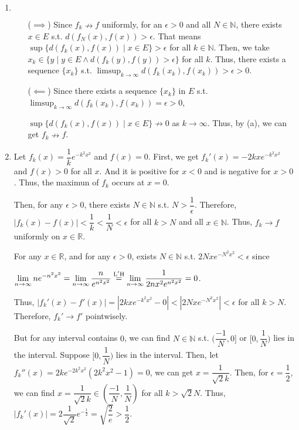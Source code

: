 \documentclass[12pt]{article}
\begin{document}
\begin{enumerate}
\begin{enumerate}
        \item $\ $\begin{enumerate}
            \item[($\implies$)] Since $f_k \nrightarrow f$ uniformly, for an $\epsilon > 0$ and all $N \in \mathbb{N}$, there exists $x \in E$ s.t. $d(f_N(x), f(x)) > \epsilon$.
            That means $\sup \{ d(f_k(x), f(x)) \mid x\in E\} > \epsilon$ for all $k \in \mathbb{N}$.
            Then, we take $x_k\in \{ y \mid y\in E \wedge d(f_k(y), f(y)) > \epsilon\}$ for all $k$.
            Thus, there exists a sequence $\{ x_k\}$ s.t. $\displaystyle\limsup_{k\to\infty} d(f_k(x_k), f(x_k)) > \epsilon > 0$.

            \item[($\impliedby$)] Since there exists a sequence $\{ x_k \}$ in $E$ s.t. $\displaystyle\limsup_{k\to\infty} d(f_k(x_k), f(x_k)) = \epsilon > 0$,

            $\sup \{ d(f_k(x), f(x)) \mid x\in E\} \nrightarrow 0$ as $k \to \infty$.
            Thus, by (a), we can get $f_k \nrightarrow f$.
        \end{enumerate}

        \item Let $f_k(x) = \dfrac{1}{k}e^{-k^2x^2}$ and $f(x) = 0$.
        First, we get $f_k'(x) = -2kxe^{-k^2x^2}$ and $f(x) > 0$ for all $x$.
        And it is positive for $x < 0$ and is negative for $x > 0$.
        Thus, the maximun of $f_k$ occurs at $x = 0$.
        
        Then, for any $\epsilon > 0$, there exists $N \in \mathbb{N}$ s.t. $N > \dfrac{1}{\epsilon}$.
        Therefore, $|f_k(x) - f(x)| < \dfrac{1}{k} < \dfrac{1}{N} < \epsilon$ for all $k > N$ and all $x\in \mathbb{N}$.
        Thus, $f_k \to f$ uniformly on $x \in \mathbb{R}$.

        For any $x \in \mathbb{R}$, and for any $\epsilon > 0$, exists $N \in \mathbb{N}$
        s.t. $2Nxe^{-N^2x^2} < \epsilon$ since 
        
        $\displaystyle\lim_{n\to\infty} ne^{-n^2x^2} = \displaystyle\lim_{n\to\infty} \dfrac{n}{e^{n^2x^2}} \overset{\rm L'H}{=} \displaystyle\lim_{n\to\infty} \dfrac{1}{2nx^2e^{n^2x^2}} = 0$.

        Thus, $|f_k'(x) - f'(x)| = |2kxe^{-k^2x^2} - 0| < |2Nxe^{-N^2x^2}| < \epsilon$ for all $k > N$.
        Therefore, $f_k' \to f'$ pointwisely.

        But for any interval contains $0$, we can find $N \in \mathbb{N}$ s.t. $(\dfrac{-1}{N}, 0]$ or $[0, \dfrac{1}{N})$ lies in the interval.
        Suppose $[0, \dfrac{1}{N})$ lies in the interval.
        Then, let $f_k''(x) = 2ke^{-2k^2x^2}(2k^2x^2 - 1) = 0$, we can get $x = \dfrac{1}{\sqrt{2} k}$.
        Then, for $\epsilon = \dfrac{1}{2}$, we can find $x = \dfrac{1}{\sqrt{2}k} \in (\dfrac{-1}{N}, \dfrac{1}{N})$ for all $k > \sqrt{2}N$.
        Thus, $|f_k'(x)| = 2\dfrac{1}{\sqrt{2}}e^{-\frac{1}{2}} = \sqrt{\dfrac{2}{e}} > \dfrac{1}{2}$.


\end{enumerate}
\end{enumerate}
\end{document}
